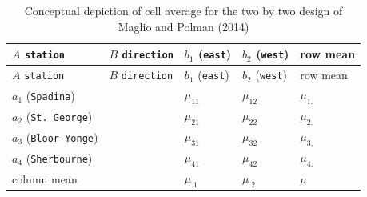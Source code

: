 \documentclass[
  11pt,
  letterpaper,
]{scrbook}
\theoremstyle{definition}
\theoremstyle{definition}
\theoremstyle{remark}
\begin{document}
\begin{longtable}[]{@{}
  >{\raggedright\arraybackslash}p{}
  >{\raggedright\arraybackslash}p{}
  >{\centering\arraybackslash}p{}
  >{\centering\arraybackslash}p{}
  >{\centering\arraybackslash}p{}@{}}
\caption{Conceptual depiction of cell average for the two by two design
of Maglio and Polman (2014)}\label{tbl-cellmeansMP14}\tabularnewline
\toprule\noalign{}
\begin{minipage}[b]{\linewidth}\raggedright
\(A\) \texttt{station}
\end{minipage} & \begin{minipage}[b]{\linewidth}\raggedright
\(B\) \texttt{direction}
\end{minipage} & \begin{minipage}[b]{\linewidth}\centering
\(b_1\) (\texttt{east})
\end{minipage} & \begin{minipage}[b]{\linewidth}\centering
\(b_2\) (\texttt{west})
\end{minipage} & \begin{minipage}[b]{\linewidth}\centering
row mean
\end{minipage} \\
\midrule\noalign{}
\endfirsthead
\toprule\noalign{}
\begin{minipage}[b]{\linewidth}\raggedright
\(A\) \texttt{station}
\end{minipage} & \begin{minipage}[b]{\linewidth}\raggedright
\(B\) \texttt{direction}
\end{minipage} & \begin{minipage}[b]{\linewidth}\centering
\(b_1\) (\texttt{east})
\end{minipage} & \begin{minipage}[b]{\linewidth}\centering
\(b_2\) (\texttt{west})
\end{minipage} & \begin{minipage}[b]{\linewidth}\centering
row mean
\end{minipage} \\
\midrule\noalign{}
\endhead
\bottomrule\noalign{}
\endlastfoot
\(a_1\) (\texttt{Spadina}) & & \(\mu_{11}\) & \(\mu_{12}\) &
\(\mu_{1.}\) \\
\(a_2\) (\texttt{St.\ George}) & & \(\mu_{21}\) & \(\mu_{22}\) &
\(\mu_{2.}\) \\
\(a_3\) (\texttt{Bloor-Yonge}) & & \(\mu_{31}\) & \(\mu_{32}\) &
\(\mu_{3.}\) \\
\(a_4\) (\texttt{Sherbourne}) & & \(\mu_{41}\) & \(\mu_{42}\) &
\(\mu_{4.}\) \\
column mean & & \(\mu_{.1}\) & \(\mu_{.2}\) & \(\mu\) \\
\end{longtable}
\end{document}
